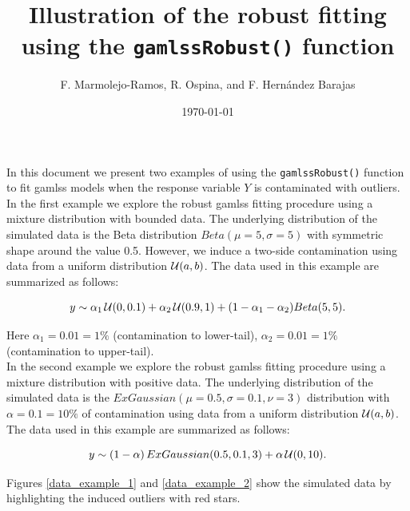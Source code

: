 \documentclass{article}
\title{Illustration of the robust fitting using the \texttt{gamlssRobust()} function} %
\author{F. Marmolejo-Ramos, R. Ospina, and F. Hern\'andez Barajas} %
\date{\today} %
\begin{document}

\maketitle %


In this document we present two examples of using the \texttt{gamlssRobust()} function to fit gamlss models when the response variable $Y$ is contaminated with outliers.\\

In the first example we explore the robust gamlss fitting procedure using a mixture distribution with bounded data. The underlying distribution of the simulated data is the Beta distribution $Beta(\mu=5,\sigma=5)$ with symmetric shape around the value 0.5. However, we induce a two-side contamination using data from a uniform distribution ${\cal U}(a, b)$. The data used in this example are summarized as follows:

\begin{equation} \label{mod_ex_1}
   y \sim \alpha_1 \, {\cal U}(0, 0.1) + \alpha_2 \, {\cal U}(0.9, 1) + (1-\alpha_1-\alpha_2)Beta(5,5).
\end{equation}

Here $\alpha_1=0.01=1\%$ (contamination to lower-tail), $\alpha_2=0.01=1\%$ (contamination to upper-tail).\\

In the second example we explore the robust gamlss fitting procedure using a mixture distribution with positive data. The underlying distribution of the simulated data is the $ExGaussian(\mu=0.5, \sigma=0.1, \nu=3)$ distribution with $\alpha=0.1=10\%$ of contamination using data from a uniform distribution ${\cal U}(a, b)$. The data used in this example are summarized as follows:

\begin{equation} \label{mod_ex_2}
   y \sim (1-\alpha) \, ExGaussian(0.5, 0.1, 3) + \alpha \, {\cal U}(0, 10).
\end{equation}

Figures \ref{data_example_1} and \ref{data_example_2} show the simulated data by highlighting the induced outliers with red stars.
\end{document}
